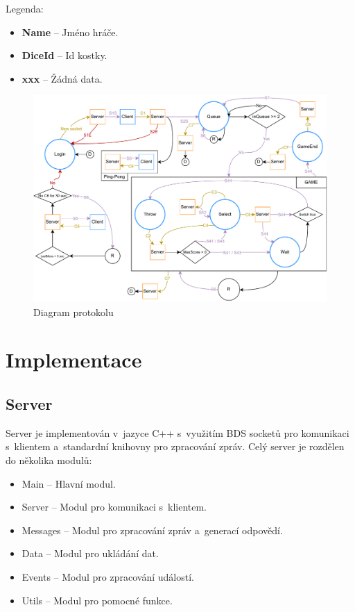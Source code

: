 \documentclass[12pt, a4paper]{article}
\begin{document}
\large
Legenda:
\normalsize
\begin{itemize}
    \item \textbf{Name} -- Jméno hráče.
    \item \textbf{DiceId} -- Id kostky.
    \item \textbf{xxx} -- Žádná data.
\end{itemize}

\newpage

\begin{landscape}
    \begin{figure}[H]
        \centering
        \includegraphics[width=1.3\textheight]{Images/Protocol.drawio.pdf}
        \caption{Diagram protokolu}
        \label{fig:diagram}
    \end{figure}
\end{landscape}

\newpage

\section{Implementace}
\subsection{Server}
Server je implementován v~jazyce C++ s~využitím BDS socketů pro komunikaci s~klientem a~standardní knihovny pro zpracování zpráv.
Celý server je rozdělen do několika modulů:
\begin{itemize}
    \item Main -- Hlavní modul.
    \item Server -- Modul pro komunikaci s~klientem.
    \item Messages -- Modul pro zpracování zpráv a~generací odpovědí.
    \item Data -- Modul pro ukládání dat.
    \item Events -- Modul pro zpracování událostí.
    \item Utils -- Modul pro pomocné funkce.
\end{itemize}
\end{document}
